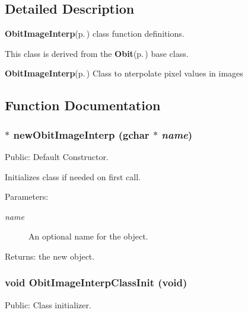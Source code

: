 \subsection{Detailed Description}
{\bf Obit\-Image\-Interp}{\rm (p.\,\pageref{structObitImageInterp})} class function definitions. 

This class is derived from the {\bf Obit}{\rm (p.\,\pageref{structObit})} base class.

{\bf Obit\-Image\-Interp}{\rm (p.\,\pageref{structObitImageInterp})} Class to nterpolate pixel values in images

\subsection{Function Documentation}
\subsubsection{$\ast$ new\-Obit\-Image\-Interp (gchar $\ast$ {\em name})}\label{ObitImageInterp_8c_a7}


Public: Default Constructor. 

Initializes class if needed on first call. \begin{Desc}
\item[Parameters:]
\begin{description}
\item[{\em name}]An optional name for the object. \end{description}
\end{Desc}
\begin{Desc}
\item[Returns:]the new object. \end{Desc}
\subsubsection{\setlength{\rightskip}{0pt plus 5cm}void Obit\-Image\-Interp\-Class\-Init (void)}\label{ObitImageInterp_8c_a16}


Public: Class initializer. 

